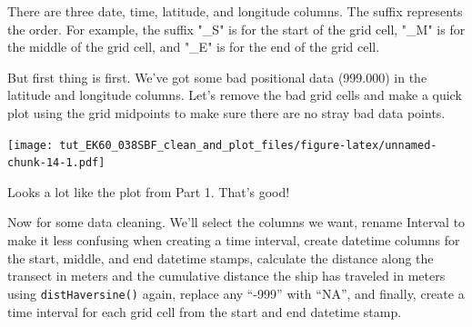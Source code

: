 \documentclass[]{article}
\newenvironment{Shaded}{\begin{snugshade}}{\end{snugshade}}
\newcommand{\FloatTok}[1]{\textcolor[rgb]{0.00,0.00,0.81}{#1}}
\newcommand{\KeywordTok}[1]{\textcolor[rgb]{0.13,0.29,0.53}{\textbf{#1}}}
\newcommand{\NormalTok}[1]{#1}
\newcommand{\OperatorTok}[1]{\textcolor[rgb]{0.81,0.36,0.00}{\textbf{#1}}}
\newcommand{\StringTok}[1]{\textcolor[rgb]{0.31,0.60,0.02}{#1}}
\begin{document}
There are three date, time, latitude, and longitude columns. The suffix
represents the order. For example, the suffix "\_S" is for the start of
the grid cell, "\_M" is for the middle of the grid cell, and "\_E" is
for the end of the grid cell.

But first thing is first. We've got some bad positional data (999.000)
in the latitude and longitude columns. Let's remove the bad grid cells
and make a quick plot using the grid midpoints to make sure there are no
stray bad data points.

\begin{Shaded}
\end{Shaded}

\texttt{[image: tut\_EK60\_038SBF\_clean\_and\_plot\_files/figure-latex/unnamed-chunk-14-1.pdf]}

Looks a lot like the plot from Part 1. That's good!

Now for some data cleaning. We'll select the columns we want, rename
Interval to make it less confusing when creating a time interval, create
datetime columns for the start, middle, and end datetime stamps,
calculate the distance along the transect in meters and the cumulative
distance the ship has traveled in meters using \texttt{distHaversine()}
again, replace any ``-999'' with ``NA'', and finally, create a time
interval for each grid cell from the start and end datetime stamp.
\end{document}
